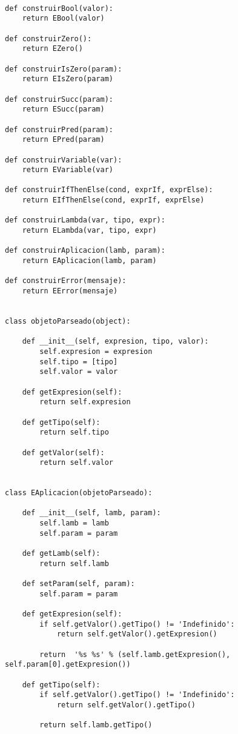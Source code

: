 \begin{verbatim}

def construirBool(valor):
    return EBool(valor)

def construirZero():
    return EZero()

def construirIsZero(param):
    return EIsZero(param)

def construirSucc(param):
    return ESucc(param)

def construirPred(param):
    return EPred(param)

def construirVariable(var):
    return EVariable(var)

def construirIfThenElse(cond, exprIf, exprElse):
    return EIfThenElse(cond, exprIf, exprElse)

def construirLambda(var, tipo, expr):
    return ELambda(var, tipo, expr)

def construirAplicacion(lamb, param):
    return EAplicacion(lamb, param)

def construirError(mensaje):
    return EError(mensaje)


class objetoParseado(object):

    def __init__(self, expresion, tipo, valor):
        self.expresion = expresion
        self.tipo = [tipo]                
        self.valor = valor

    def getExpresion(self):
        return self.expresion
    
    def getTipo(self):
        return self.tipo

    def getValor(self):
        return self.valor


class EAplicacion(objetoParseado):

    def __init__(self, lamb, param):
        self.lamb = lamb
        self.param = param

    def getLamb(self):
        return self.lamb

    def setParam(self, param):
        self.param = param

    def getExpresion(self):
        if self.getValor().getTipo() != 'Indefinido':      
            return self.getValor().getExpresion()

        return  '%s %s' % (self.lamb.getExpresion(), self.param[0].getExpresion())        
    
    def getTipo(self):
        if self.getValor().getTipo() != 'Indefinido':        
            return self.getValor().getTipo()
        
        return self.lamb.getTipo()


\end{verbatim}

